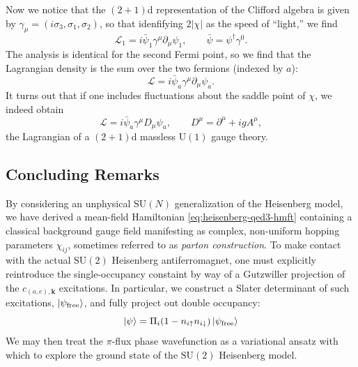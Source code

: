 \documentclass{report}
\begin{document}
Now we notice that the $ (2+1) $d representation of the Clifford algebra is 
given by $ \gamma_\mu = (i\sigma_3, \sigma_1, \sigma_2) $, so that idenfifying 
$ 2|\chi| $ as the speed of ``light,'' we find 
\begin{equation*}
	\mathcal{L}_1 = i\bar{\psi}_1 \gamma^\mu \partial_\mu \psi_1,\qquad 
	\bar{\psi} = \psi^\dagger \gamma^0.
\end{equation*}
The analysis is identical for the second Fermi point, so we find that the 
Lagrangian density is the sum over the two fermions (indexed by $ a $): 
\begin{equation*}
	\mathcal{L}= i\bar{\psi}_a \gamma^\mu \partial_\mu \psi_a. 
\end{equation*}
It turns out that if one includes fluctuations about the saddle point of 
$ \chi $, we indeed obtain 
\begin{equation*}
	\mathcal{L} = i\bar{\psi}_a \gamma^\mu D_{\mu} \psi_a ,\qquad 
	D^\mu =\partial^\mu +igA^\mu,
\end{equation*}
the Lagrangian of a $ (2+1) $d massless $ \text{U}(1) $ gauge theory. 

\subsection{Concluding Remarks}
By considering an unphysical $ \text{SU}(N)$ generalization of the Heisenberg
model, we have derived a mean-field Hamiltonian \cref{eq:heisenberg-qed3-hmft}
containing a classical background gauge field manifesting as complex, non-uniform 
hopping parameters $ \chi_{ij} $, sometimes referred to as \textit{parton
construction}. To make contact with the actual $ \text{SU}(2) $ Heisenberg
antiferromagnet, one must explicitly reintroduce the single-occupancy constaint
by way of a Gutzwiller projection of the $ c_{(o,e), \mathbf{k}} $ excitations. 
In particular, we construct a Slater determinant of such excitations, 
$ \ket{\psi_\text{free}} $, and fully project out double occupancy: 
\begin{equation*}
	\ket{\psi} = \Pi_i (1-n_{i\uparrow}n_{i\downarrow})\ket{\psi_{\text{free}}}
\end{equation*}
We may then treat the $ \pi $-flux 
phase wavefunction as a variational ansatz with which to explore the ground state 
of the $ \text{SU}(2) $ Heisenberg model.
\end{document}
